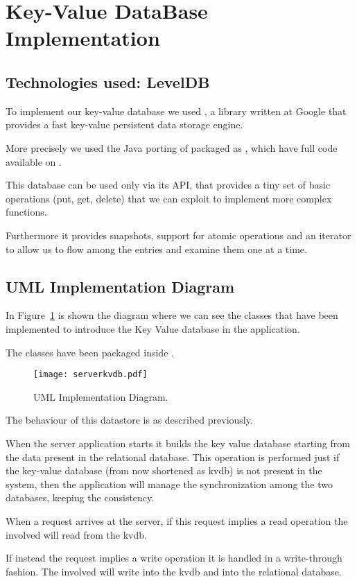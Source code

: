 \section{Key-Value DataBase Implementation}

\subsection{Technologies used: LevelDB}

To implement our key-value database we used , a library
written at Google that provides a fast key-value persistent data storage engine.

More precisely we used the Java porting of  packaged as
, which have full code available on .



This database can be used only via its API, that provides a tiny set of basic
operations (put, get, delete) that we can exploit to implement more complex
functions.

Furthermore it provides snapshots, support for atomic operations and
an iterator to allow us to flow among the entries and examine them one at a
time.

\subsection{UML Implementation Diagram}

In Figure~\ref{fig:serverkvdb} is shown the diagram where we can see the classes
that have been implemented to introduce the Key Value database in the
application.

The classes have been packaged inside .

\begin{landscape}
	\begin{figure}
		\texttt{[image: serverkvdb.pdf]}
		\caption{ UML Implementation Diagram.}
		\label{fig:serverkvdb}
	\end{figure}
\end{landscape}

The behaviour of this datastore is as described previously.

When the server application starts it builds the key value database starting
from the data present in the relational database. This operation is performed
just if the key-value database (from now shortened as kvdb) is not present in
the system, then the application will manage the synchronization among the two
databases, keeping the consistency.

When a request arrives at the server, if this request implies a read operation
the  involved will read from the kvdb.

If instead the request implies a write operation it is handled in a
write-through fashion. The  involved will write into the
kvdb and into the relational database.
